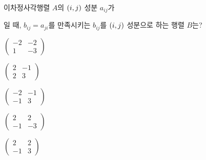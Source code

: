 이차정사각행렬 $A$의 $(i{,}\mkern3mu\mathopen{}j)$ 성분 $a_{ij}$가\par\smallskip{}\par\smallskip\noindent 일 때, $b_{ij}=a_{ji}$를 만족시키는 $b_{ij}$를 $(i{,}\mkern3mu\mathopen{}j)$ 성분으로 하는 행렬 $B$는?
\begin{choicesii}{\rule[-3.0ex]{0pt}{8.0ex}$\begin{pmatrix} -2 & -2 \\ 1 & -3 \end{pmatrix}$}{\rule[-3.0ex]{0pt}{8.0ex}$\begin{pmatrix} 2 & -1 \\ 2 & 3 \end{pmatrix}$}{\rule[-3.0ex]{0pt}{8.0ex}$\begin{pmatrix} -2 & -1 \\ -1 & 3 \end{pmatrix}$}{\rule[-3.0ex]{0pt}{8.0ex}$\begin{pmatrix} 2 & 2 \\ -1 & -3 \end{pmatrix}$}{\rule[-3.0ex]{0pt}{8.0ex}$\begin{pmatrix} 2 & 2 \\ -1 & 3 \end{pmatrix}$}\end{choicesii}
